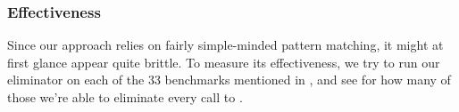 \subsubsection{Effectiveness}

Since our approach relies on fairly simple-minded pattern matching, it might at
first glance appear quite brittle. To measure its effectiveness, we try to run
our eliminator on each of the 33 benchmarks mentioned in
, and see for how many of those we're able to
eliminate every call to .
